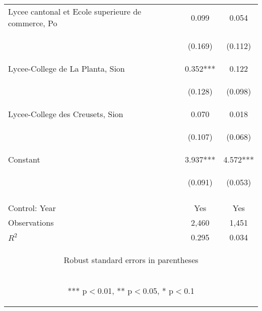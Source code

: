 \begin{tabular}{lcc}
Lycee cantonal et Ecole superieure de commerce, Po & 0.099 & 0.054 \\
\vspace{4pt} & \begin{footnotesize}(0.169)\end{footnotesize} & \begin{footnotesize}(0.112)\end{footnotesize} \\
Lycee-College de La Planta, Sion & 0.352*** & 0.122 \\
\vspace{4pt} & \begin{footnotesize}(0.128)\end{footnotesize} & \begin{footnotesize}(0.098)\end{footnotesize} \\
Lycee-College des Creusets, Sion & 0.070 & 0.018 \\
\vspace{4pt} & \begin{footnotesize}(0.107)\end{footnotesize} & \begin{footnotesize}(0.068)\end{footnotesize} \\
Constant & 3.937*** & 4.572*** \\
 & \begin{footnotesize}(0.091)\end{footnotesize} & \begin{footnotesize}(0.053)\end{footnotesize} \\
\vspace{4pt} & \begin{footnotesize}\end{footnotesize} & \begin{footnotesize}\end{footnotesize} \\
Control: Year & Yes & Yes \\ \hline
Observations & 2,460 & 1,451 \\
 $R^2$ & 0.295 & 0.034 \\ \hline
\multicolumn{3}{c}{\begin{footnotesize} Robust standard errors in parentheses\end{footnotesize}} \\
\multicolumn{3}{c}{\begin{footnotesize} *** p$<$0.01, ** p$<$0.05, * p$<$0.1\end{footnotesize}} \\
\end{tabular}

